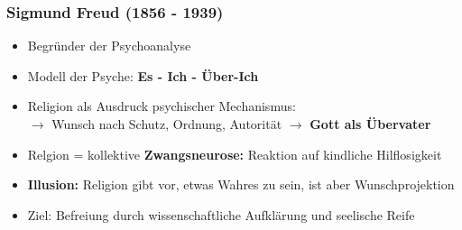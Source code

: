 \subsubsection{Sigmund Freud (1856 - 1939)}
\begin{itemize}
    \item Begründer der Psychoanalyse
    \item Modell der Psyche: \textbf{Es - Ich - Über-Ich}
    \item Religion als Ausdruck psychischer Mechanismus: \\
    $\rightarrow$ Wunsch nach Schutz, Ordnung, Autorität $\rightarrow$ \textbf{Gott als Übervater}
    \item Relgion = kollektive \textbf{Zwangsneurose:} Reaktion auf kindliche Hilflosigkeit
    \item \textbf{Illusion:} Religion gibt vor, etwas Wahres zu sein, ist aber Wunschprojektion
    \item Ziel: Befreiung durch wissenschaftliche Aufklärung und seelische Reife
\end{itemize}

